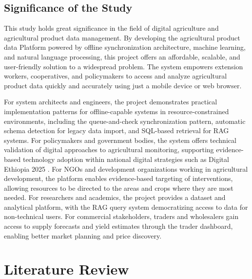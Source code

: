 \documentclass[12pt,a4paper,oneside]{report}
\begin{document}
\section{Significance of the Study}
This study holds great significance in the field of digital agriculture and agricultural product data management. By developing the agricultural product data Platform powered by offline synchronization architecture, machine learning, and natural language processing, this project offers an affordable, scalable, and user-friendly solution to a widespread problem. The system empowers extension workers, cooperatives, and policymakers to access and analyze agricultural product data quickly and accurately using just a mobile device or web browser.

For system architects and engineers, the project demonstrates practical implementation patterns for offline-capable systems in resource-constrained environments, including the queue-and-check synchronization pattern, automatic schema detection for legacy data import, and SQL-based retrieval for RAG systems. For policymakers and government bodies, the system offers technical validation of digital approaches to agricultural monitoring, supporting evidence-based technology adoption within national digital strategies such as Digital Ethiopia 2025 \cite{digitalethiopia2025}. For NGOs and development organizations working in agricultural development, the platform enables evidence-based targeting of interventions, allowing resources to be directed to the areas and crops where they are most needed. For researchers and academics, the project provides a dataset and analytical platform, with the RAG query system democratizing access to data for non-technical users. For commercial stakeholders, traders and wholesalers gain access to supply forecasts and yield estimates through the trader dashboard, enabling better market planning and price discovery.

\clearpage
\chapter{Literature Review}
\end{document}
